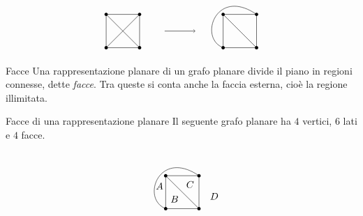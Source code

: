 \documentclass[a4paper]{article}
\begin{document}
\[
\begin{tikzpicture}[scale=1]
    \begin{scope}
        \coordinate (a) at (0,0);
        \coordinate (b) at (1.2,0);
        \coordinate (c) at (1.2,1.2);
        \coordinate (d) at (0,1.2);

        \draw (a)--(b)--(c)--(d)--cycle;
        \draw (a)--(c);
        \draw (b)--(d);

        \foreach \p in {a,b,c,d}{
            \fill (\p) circle (1.7pt);
        }
    \end{scope}

    \draw[->] (2.1,0.6)--(3.2,0.6);

    \begin{scope}[xshift=4.2cm]
        \coordinate (a) at (0,0);
        \coordinate (b) at (1.2,0);
        \coordinate (c) at (1.2,1.2);
        \coordinate (d) at (0,1.2);

        \draw (a)--(b)--(c)--(d)--cycle;
        \draw (d)--(b);
        \draw (a) .. controls +(-0.90,0.35) and +(-1.45,1.00) .. (c);

        \foreach \p in {a,b,c,d}{
            \fill (\p) circle (1.7pt);
        }
    \end{scope}
\end{tikzpicture}
\]

\begin{snippetdefinition}{Facce}
    Una rappresentazione planare di un grafo planare divide il piano in regioni connesse, dette \emph{facce}. Tra queste si conta anche la faccia esterna, cioè la regione illimitata.
\end{snippetdefinition}

\begin{snippetexample}{Facce di una rappresentazione planare}
    Il seguente grafo planare ha \(4\) vertici, \(6\) lati e \(4\) facce.
    \[
        \begin{tikzpicture}[scale=1]
            \coordinate (a) at (0,0);
            \coordinate (b) at (1.2,0);
            \coordinate (c) at (1.2,1.2);
            \coordinate (d) at (0,1.2);

            \draw (a)--(b)--(c)--(d)--cycle;
            \draw (d)--(b);
            \draw (a) .. controls +(-0.90,0.35) and +(-1.45,1.00) .. (c);

            \node at (-0.22,0.82) {\(A\)};
            \node at (0.32,0.35) {\(B\)};
            \node at (0.88,0.88) {\(C\)};
            \node at (1.75,0.45) {\(D\)};

            \foreach \p in {a,b,c,d}{
                \fill (\p) circle (1.7pt);
            }
        \end{tikzpicture}
    \]
\end{snippetexample}
\end{document}
